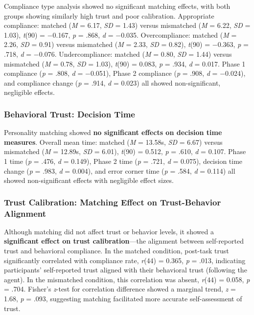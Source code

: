 \documentclass[12pt]{article}
\begin{document}
Compliance type analysis showed no significant matching effects, with both groups showing similarly high trust and poor calibration. Appropriate compliance: matched (\textit{M} = 6.17, \textit{SD} = 1.43) versus mismatched (\textit{M} = 6.22, \textit{SD} = 1.03), \textit{t}(90) = $-$0.167, \textit{p} = .868, \textit{d} = $-$0.035. Overcompliance: matched (\textit{M} = 2.26, \textit{SD} = 0.91) versus mismatched (\textit{M} = 2.33, \textit{SD} = 0.82), \textit{t}(90) = $-$0.363, \textit{p} = .718, \textit{d} = $-$0.076. Undercompliance: matched (\textit{M} = 0.80, \textit{SD} = 1.44) versus mismatched (\textit{M} = 0.78, \textit{SD} = 1.03), \textit{t}(90) = 0.083, \textit{p} = .934, \textit{d} = 0.017. Phase 1 compliance (\textit{p} = .808, \textit{d} = $-$0.051), Phase 2 compliance (\textit{p} = .908, \textit{d} = $-$0.024), and compliance change (\textit{p} = .914, \textit{d} = 0.023) all showed non-significant, negligible effects.

\subsubsection{Behavioral Trust: Decision Time}

Personality matching showed \textbf{no significant effects on decision time measures}. Overall mean time: matched (\textit{M} = 13.58s, \textit{SD} = 6.67) versus mismatched (\textit{M} = 12.89s, \textit{SD} = 6.01), \textit{t}(90) = 0.512, \textit{p} = .610, \textit{d} = 0.107. Phase 1 time (\textit{p} = .476, \textit{d} = 0.149), Phase 2 time (\textit{p} = .721, \textit{d} = 0.075), decision time change (\textit{p} = .983, \textit{d} = 0.004), and error corner time (\textit{p} = .584, \textit{d} = 0.114) all showed non-significant effects with negligible effect sizes.

\subsubsection{Trust Calibration: Matching Effect on Trust-Behavior Alignment}

Although matching did not affect trust or behavior levels, it showed a \textbf{significant effect on trust calibration}---the alignment between self-reported trust and behavioral compliance. In the matched condition, post-task trust significantly correlated with compliance rate, \textit{r}(44) = 0.365, \textit{p} = .013, indicating participants' self-reported trust aligned with their behavioral trust (following the agent). In the mismatched condition, this correlation was absent, \textit{r}(44) = 0.058, \textit{p} = .704. Fisher's \textit{z}-test for correlation difference showed a marginal trend, \textit{z} = 1.68, \textit{p} = .093, suggesting matching facilitated more accurate self-assessment of trust.
\end{document}
